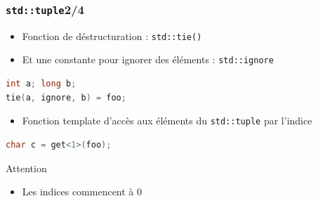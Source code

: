 \documentclass[C++.tex]{subfiles}
\begin{document}
\begin{frame}[fragile]
	\frametitle{\lstinline|std::tuple|\titlehfill{}2/4}
	\begin{itemize}
		\item Fonction de déstructuration : \lstinline|std::tie()|
		\item Et une constante pour ignorer des éléments : \lstinline|std::ignore|
	\end{itemize}

	\begin{lstlisting}[language=C++]
int a; long b;
tie(a, ignore, b) = foo;\end{lstlisting}


	\begin{itemize}
		\item Fonction template d'accès aux éléments du \lstinline|std::tuple| par l'indice
	\end{itemize}

	\begin{lstlisting}[language=C++]
char c = get<1>(foo);\end{lstlisting}

	\begin{alertblock}{Attention}
		\begin{itemize}
			\item Les indices commencent à 0
		\end{itemize}
	\end{alertblock}
\end{frame}
\end{document}
